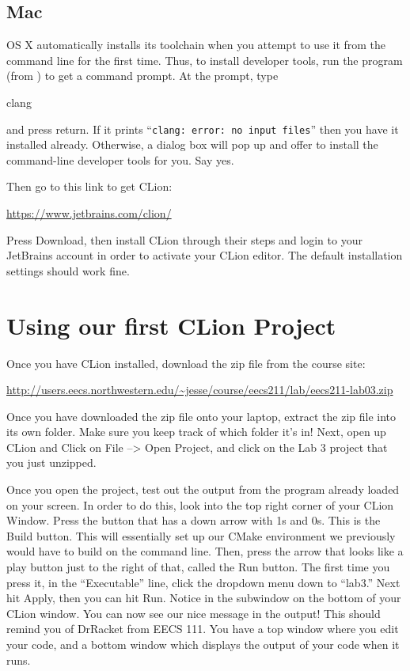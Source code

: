 \documentclass{tufte-handout}
\begin{document}
\subsection{Mac}

OS X automatically installs its toolchain when you
attempt to use it from the command line for the first time. Thus, to
install developer tools, run the  program (from
) to get a command prompt. At the prompt, type

\begin{CmdLine}
  \prompt clang
\end{CmdLine}

\noindent
and press return. If it prints ``\texttt{clang: error: no input files}''
then you have it installed already. Otherwise, a dialog box will pop up
and offer to install the command-line developer tools for you. Say yes.

Then go to this link to get CLion:

\medskip
\url{https://www.jetbrains.com/clion/}

\medskip\noindent
Press Download, then install CLion through their steps and login to your
JetBrains account in order to activate your CLion editor. The default
installation settings should work fine.

\section{Using our first CLion Project}

Once you have CLion installed, download the zip file from the course
site: \medskip

\url{http://users.eecs.northwestern.edu/~jesse/course/eecs211/lab/eecs211-lab03.zip} \medskip

\noindent
Once you have downloaded the zip file onto your laptop, extract the zip file into its own folder. Make sure you keep track of which folder it's in!  Next, open up CLion and Click on File --> Open Project, and click on the Lab 3 project that you just unzipped. 

Once you open the project, test out the output from the program already loaded on your screen.  In order to do this, look into the top right corner of your CLion Window.  Press the button that has a down arrow with 1s and 0s.  This is the Build button.  This will essentially set up our CMake environment we previously would have to build on the command line. Then, press the arrow that looks like a play button just to the right of that, called the Run button.  The first time you press it, in the ``Executable'' line, click the dropdown menu down to ``lab3.''  Next hit Apply, then you can hit Run.  Notice in the subwindow on the bottom of your CLion window. You can now see our nice message in the output! This should remind you of DrRacket from EECS 111. You have a top window where you edit your code, and a bottom window which displays the output of your code when it runs.
\end{document}
